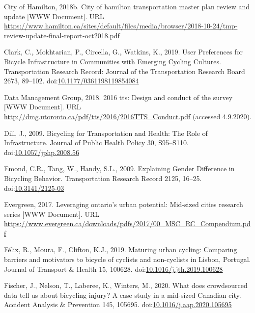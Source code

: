 \documentclass[]{elsarticle} %
\begin{document}
\leavevmode\hypertarget{ref-Tmp2018}{}%
City of Hamilton, 2018b. City of hamilton transportation master plan
review and update {[}WWW Document{]}. URL
\url{https://www.hamilton.ca/sites/default/files/media/browser/2018-10-24/tmp-review-update-final-report-oct2018.pdf}

\leavevmode\hypertarget{ref-clarkUserPreferencesBicycle2019a}{}%
Clark, C., Mokhtarian, P., Circella, G., Watkins, K., 2019. User
Preferences for Bicycle Infrastructure in Communities with Emerging
Cycling Cultures. Transportation Research Record: Journal of the
Transportation Research Board 2673, 89--102.
doi:\href{https://doi.org/10.1177/0361198119854084}{10.1177/0361198119854084}

\leavevmode\hypertarget{ref-Dmg2018tts}{}%
Data Management Group, 2018. 2016 tts: Design and conduct of the survey
{[}WWW Document{]}. URL
\url{http://dmg.utoronto.ca/pdf/tts/2016/2016TTS_Conduct.pdf} (accessed
4.9.2020).

\leavevmode\hypertarget{ref-dillBicyclingTransportationHealth2009}{}%
Dill, J., 2009. Bicycling for Transportation and Health: The Role of
Infrastructure. Journal of Public Health Policy 30, S95--S110.
doi:\href{https://doi.org/10.1057/jphp.2008.56}{10.1057/jphp.2008.56}

\leavevmode\hypertarget{ref-emondExplainingGenderDifference2009}{}%
Emond, C.R., Tang, W., Handy, S.L., 2009. Explaining Gender Difference
in Bicycling Behavior. Transportation Research Record 2125, 16--25.
doi:\href{https://doi.org/10.3141/2125-03}{10.3141/2125-03}

\leavevmode\hypertarget{ref-evergreenleveraging2017}{}%
Evergreen, 2017. Leveraging ontario's urban potential: Mid-sized cities
research series {[}WWW Document{]}. URL
\url{https://www.evergreen.ca/downloads/pdfs/2017/00_MSC_RC_Compendium.pdf}

\leavevmode\hypertarget{ref-felixMaturingUrbanCycling2019}{}%
Félix, R., Moura, F., Clifton, K.J., 2019. Maturing urban cycling:
Comparing barriers and motivators to bicycle of cyclists and
non-cyclists in Lisbon, Portugal. Journal of Transport \& Health 15,
100628.
doi:\href{https://doi.org/10.1016/j.jth.2019.100628}{10.1016/j.jth.2019.100628}

\leavevmode\hypertarget{ref-fischerWhatDoesCrowdsourced2020}{}%
Fischer, J., Nelson, T., Laberee, K., Winters, M., 2020. What does
crowdsourced data tell us about bicycling injury? A case study in a
mid-sized Canadian city. Accident Analysis \& Prevention 145, 105695.
doi:\href{https://doi.org/10.1016/j.aap.2020.105695}{10.1016/j.aap.2020.105695}
\end{document}

